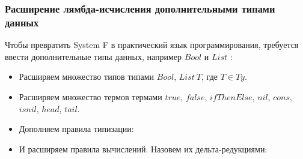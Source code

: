 \subsubsection{Расширение лямбда-исчисления дополнительными типами данных}

Чтобы превратить System F в практический язык программирования,
требуется ввести дополнительные типы данных, например \(Bool\)
и \(List\) \cite{tapl}:
\begin{itemize}
\item Расширяем множество типов типами \(Bool\), \(List\ T\), где \(T \in Ty\).
\item Расширяем множество термов термами \(true\), \(false\), \(ifThenElse\),
   \(nil\), \(cons\), \(isnil\), \(head\), \(tail\).
\item Дополняем правила типизации:
   \begin{prooftree}
   \end{prooftree}
   \begin{prooftree}
   \end{prooftree}
   \begin{prooftree}
   \end{prooftree}

   \begin{prooftree}
   \end{prooftree}
   \begin{prooftree}
   \end{prooftree}
   \begin{prooftree}
   \end{prooftree}
   \begin{prooftree}
   \end{prooftree}
   \begin{prooftree}
   \end{prooftree}
\item И расширяем правила вычислений. Назовем их дельта-редукциями:
   \begin{prooftree}
   \end{prooftree}
   \begin{prooftree}
   \end{prooftree}
   \begin{prooftree}
   \end{prooftree}


\end{itemize}
